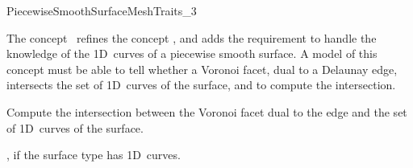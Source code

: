 
\begin{ccRefConcept}{PiecewiseSmoothSurfaceMeshTraits_3}

\ccDefinition
  
The concept \ccRefName\ refines the concept , and
adds the requirement to handle the knowledge of the 1D~curves of a
piecewise smooth surface. A model of this concept must be able to tell
whether a Voronoi facet, dual to a Delaunay edge, intersects the set of
1D~curves of the surface, and to compute the intersection.

\ccRefines
{}

\ccTypes


{}  %


{ Compute the intersection between the Voronoi facet dual to the edge
   and the set of 1D~curves of the surface. }

\ccHasModels

, if the surface type
 has 1D~curves.

\ccSeeAlso
{}\\

\end{ccRefConcept}


